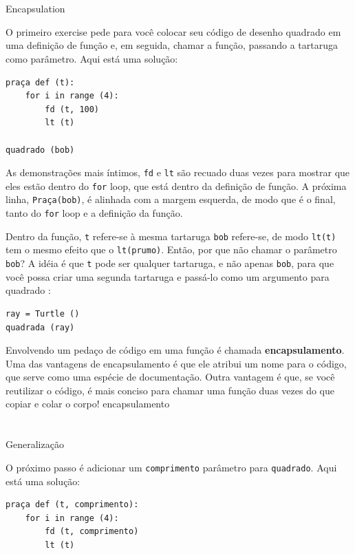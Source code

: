 \documentclass[10pt]{book}
\begin{document}
\begin{exercise}
\begin{enumerate}
\end{enumerate}

\section{} Encapsulation

O primeiro exercise pede para você colocar seu código de desenho quadrado
em uma definição de função e, em seguida, chamar a função, passando
a tartaruga como parâmetro. Aqui está uma solução:

\begin{verbatim}
praça def (t):
    for i in range (4):
        fd (t, 100)
        lt (t)

quadrado (bob)
\end{verbatim}
%
As demonstrações mais íntimos, {\tt fd} e {\tt lt} são
recuado duas vezes para mostrar que eles estão dentro do {\tt for} loop,
que está dentro da definição de função. A próxima linha,
{\tt Praça(bob)}, é alinhada com a margem esquerda, de modo que é o
final, tanto do {\tt for} loop e a definição da função.

Dentro da função, {\tt t} refere-se à mesma tartaruga {\tt bob}
refere-se, de modo {\tt lt(t)} tem o mesmo efeito que o {\tt lt(prumo)}.
Então, por que não chamar o parâmetro {\tt bob}? A idéia é que {\tt t}
pode ser qualquer tartaruga, e não apenas {\tt bob}, para que você possa criar
uma segunda tartaruga e passá-lo como um argumento para {quadrado \tt}:

\begin{verbatim}
ray = Turtle ()
quadrada (ray)
\end{verbatim}
%
Envolvendo um pedaço de código em uma função é chamada {\bf
encapsulamento}. Uma das vantagens de encapsulamento é que ele
atribui um nome para o código, que serve como uma espécie de documentação.
Outra vantagem é que, se você reutilizar o código, é mais conciso
para chamar uma função duas vezes do que copiar e colar o corpo!
\index{} encapsulamento


\section{} Generalização

O próximo passo é adicionar um {\tt comprimento} parâmetro para {\tt quadrado}.
Aqui está uma solução:

\begin{verbatim}
praça def (t, comprimento):
    for i in range (4):
        fd (t, comprimento)
        lt (t)


\end{verbatim}
\end{exercise}
\end{document}
